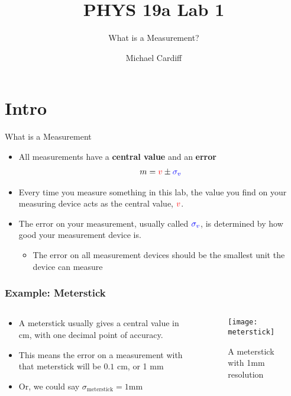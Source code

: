 \documentclass[aspectratio=169]{beamer}
\title{PHYS 19a Lab 1}
\author{Michael Cardiff}
\subtitle{What is a Measurement?}
\begin{document}
\begin{frame}
  \titlepage
\end{frame}

\section{Intro}
\begin{frame}{What is a Measurement}
  \begin{itemize}
  \item All measurements have a {\color{red}\textbf{central value}} and an {\color{blue}\textbf{error}}
    \begin{align*}
      m={\color{red}v}\pm{\color{blue}\sigma_v}
    \end{align*}
  \item Every time you measure something in this lab, the value you find on your measuring device acts as the central value, ${\color{red}v}$.
  \item The error on your measurement, usually called ${\color{blue}\sigma_v}$, is determined by how good your measurement device is.
    \begin{itemize}
    \item The error on all measurement devices should be the smallest unit the device can measure
    \end{itemize}
  \end{itemize}
\end{frame}

\begin{frame}
  \frametitle{Example: Meterstick}
  \begin{columns}
    \begin{column}{0.5\textwidth}
      \begin{itemize}
      \item A meterstick usually gives a central value in cm, with one decimal point of accuracy.
      \item This means the error on a measurement with that meterstick will be $0.1$ cm, or 1 mm
      \item Or, we could say $\sigma_{\text{meterstick}}=1$mm
      \end{itemize}
    \end{column}
    \begin{column}{0.5\textwidth}
      \begin{figure}[H]
        \centering
        \texttt{[image: meterstick]}
        \caption{A meterstick with 1mm resolution}
      \end{figure}
    \end{column}
  \end{columns}
\end{frame}
\end{document}
